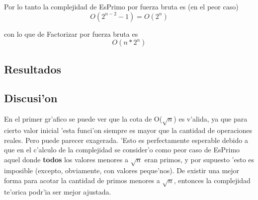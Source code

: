 Por lo tanto la complejidad de EsPrimo por fuerza bruta es (en el peor caso)
$$O(2^{n-2}-1) = O(2^n)$$

con lo que de Factorizar por fuerza bruta es
$$O(n*2^n)$$



\clearpage
\subsection{Resultados}
\clearpage


\subsection{Discusi'on}
En el primer gr'afico se puede ver que la cota de O($\sqrt{n}$) es v'alida, ya que para cierto valor inicial 'esta funci'on siempre es mayor que la cantidad de operaciones reales. Pero puede parecer exagerada. 'Esto es perfectamente esperable debido a que en el c'alculo de la complejidad se consider'o como peor caso de EsPrimo aquel donde {\bf todos} los valores menores a $\sqrt{n}$ eran primos, y por supuesto 'esto es imposible (excepto, obviamente, con valores peque'nos). De existir una mejor forma para acotar la cantidad de primos menores a $\sqrt{n}$, entonces la complejidad te'orica podr'ia ser mejor ajustada.

